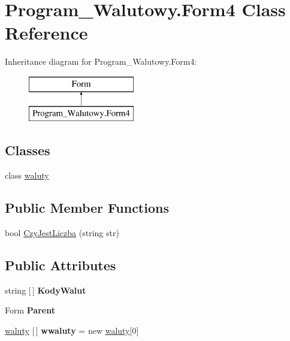 \hypertarget{class_program___walutowy_1_1_form4}{}\section{Program\+\_\+\+Walutowy.\+Form4 Class Reference}
\label{class_program___walutowy_1_1_form4}
Inheritance diagram for Program\+\_\+\+Walutowy.\+Form4\+:\begin{figure}[H]
\begin{center}
\leavevmode
\includegraphics[height=2.000000cm]{class_program___walutowy_1_1_form4}
\end{center}
\end{figure}
\subsection*{Classes}
\begin{DoxyCompactItemize}
\item 
class \mbox{\hyperlink{class_program___walutowy_1_1_form4_1_1waluty}{waluty}}
\end{DoxyCompactItemize}
\subsection*{Public Member Functions}
\begin{DoxyCompactItemize}
\item 
bool \mbox{\hyperlink{class_program___walutowy_1_1_form4_ad2f3b1fb24bb14c5a3fd9790dc7c517f}{Czy\+Jest\+Liczba}} (string str)
\end{DoxyCompactItemize}
\subsection*{Public Attributes}
\begin{DoxyCompactItemize}
\item 
\mbox{\label{class_program___walutowy_1_1_form4_a943af53c7434392b6b425112773fac86}} 
string \mbox{[}$\,$\mbox{]} {\bfseries Kody\+Walut}
\item 
\mbox{\label{class_program___walutowy_1_1_form4_ae29401105a08d1b14cd2764bee58d5e2}} 
Form {\bfseries Parent}
\item 
\mbox{\label{class_program___walutowy_1_1_form4_acba99f1cee26b78fb0e21d90d4ea88c7}} 
\mbox{\hyperlink{class_program___walutowy_1_1_form4_1_1waluty}{waluty}} \mbox{[}$\,$\mbox{]} {\bfseries wwaluty} = new \mbox{\hyperlink{class_program___walutowy_1_1_form4_1_1waluty}{waluty}}\mbox{[}0\mbox{]}
\end{DoxyCompactItemize}
